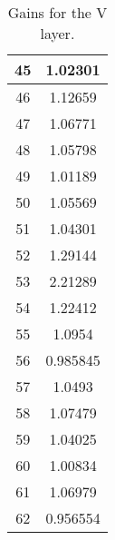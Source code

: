\begin{table}[h]
\begin{subtable}[h]{2in}
{\begin{tabular}{|c|c|}
45	&	1.02301	\\	\hline
46	&	1.12659	\\	\hline
47	&	1.06771	\\	\hline
48	&	1.05798	\\	\hline
49	&	1.01189	\\	\hline
50	&	1.05569	\\	\hline
51	&	1.04301	\\	\hline
52	&	1.29144	\\	\hline
53	&	2.21289	\\	\hline
54	&	1.22412	\\	\hline
55	&	1.0954	\\	\hline
56	&	0.985845	\\	\hline
57	&	1.0493	\\	\hline
58	&	1.07479	\\	\hline
59	&	1.04025	\\	\hline
60	&	1.00834	\\	\hline
61	&	1.06979	\\	\hline
62	&	0.956554	\\	\hline
        \end{tabular}
        }
        \caption{Gains for the V layer.}
    \end{subtable}
    \quad
    \begin{subtable}[h]{2in}
        \centering{}
\end{subtable}
\end{table}
